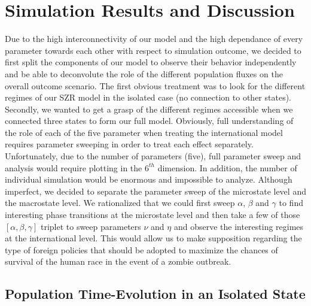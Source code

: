 \documentclass[11pt]{article} %
\begin{document}
\newpage
\section{Simulation Results and Discussion}\indent

Due to the high interconnectivity of our model and the high dependance of every parameter towards each other with respect to simulation outcome, we decided to first split the components of our model to observe their behavior independently and be able to deconvolute the role of the different population fluxes on the overall outcome scenario. The first obvious treatment was to look for the different regimes of our SZR model in the isolated case (no connection to other states). Secondly, we wanted to get a grasp of the different regimes accessible when we connected three states to form our full model. Obviously, full understanding of the role of each of the five parameter when treating the international model requires parameter sweeping in order to treat each effect separately. Unfortunately, due to the number of parameters (five), full parameter sweep and analysis would require plotting in the $6^{th}$ dimension. In addition, the number of individual simulation would be enormous and impossible to analyze. Although imperfect, we decided to separate the parameter sweep of the microstate level and the macrostate level. We rationalized that we could first sweep $\alpha$, $\beta$ and $\gamma$  to find interesting phase transitions at the microstate level and then take a few of those $[\alpha, \beta, \gamma]$ triplet to sweep parameters $\nu$ and $\eta$ and observe the interesting regimes at the international level. This would allow us to make supposition regarding the type of foreign policies that should be adopted to maximize the chances of survival of the human race in the event of a zombie outbreak. 

\subsection{Population Time-Evolution in an Isolated State}\indent
\label{szr}
\end{document}
